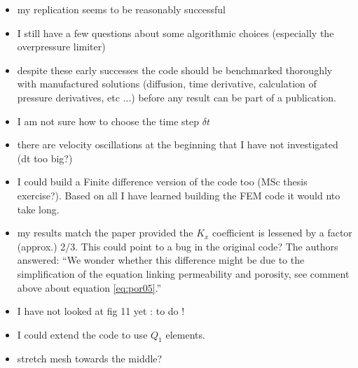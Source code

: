 \begin{itemize}
\item my replication seems to be reasonably successful
\item I still have a few questions about some algorithmic choices (especially the 
overpressure limiter)
\item despite these early successes the code should be benchmarked thoroughly 
with manufactured solutions (diffusion, time derivative, calculation 
of pressure derivatives, etc ...) before any result can be part of a publication. 
\item I am not sure how to choose the time step $\delta t$
\item there are velocity oscillations at the beginning that I have not investigated (dt too big?)
\item I could build a Finite difference version of the code too (MSc thesis exercise?).
Based on all I have learned building the FEM code it would nto take long.
\item my results match the paper provided the $K_x$ coefficient is lessened by a factor (approx.) 2/3.
This could point to a bug in the original code? The authors answered:
``We wonder whether this difference might be due to the simplification of the equation 
linking permeability and porosity, see comment above about equation \eqref{eq:por05}.''
\item I have not looked at fig 11 yet : to do !
\item I could extend the code to use $Q_1$ elements.
\item stretch mesh towards the middle?
\end{itemize} 


